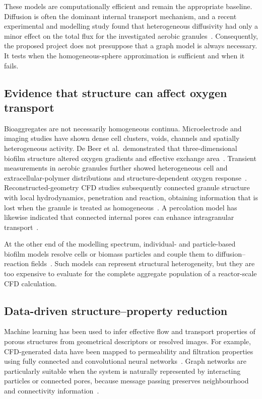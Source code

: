 \documentclass[11pt,a4paper]{article}
\begin{document}
These models are computationally efficient and remain the appropriate
baseline. Diffusion is often the dominant internal transport mechanism, and a
recent experimental and modelling study found that heterogeneous diffusivity
had only a minor effect on the total flux for the investigated aerobic
granules~\cite{VandenBerg2020}. Consequently, the proposed project does not
presuppose that a graph model is always necessary. It tests when the
homogeneous-sphere approximation is sufficient and when it fails.

\subsection{Evidence that structure can affect oxygen transport}

Bioaggregates are not necessarily homogeneous continua. Microelectrode and
imaging studies have shown dense cell clusters, voids, channels and spatially
heterogeneous activity. De Beer et al.\ demonstrated that three-dimensional
biofilm structure altered oxygen gradients and effective exchange
area~\cite{DeBeer1994}. Transient measurements in aerobic granules further
showed heterogeneous cell and extracellular-polymer distributions and
structure-dependent oxygen response~\cite{Chiu2007}. Reconstructed-geometry
CFD studies subsequently connected granule structure with local
hydrodynamics, penetration and reaction, obtaining information that is lost
when the granule is treated as homogeneous~\cite{Liu2010}. A percolation model
has likewise indicated that connected internal pores can enhance intragranular
transport~\cite{Liu2011Percolation}.

At the other end of the modelling spectrum, individual- and particle-based
biofilm models resolve cells or biomass particles and couple them to
diffusion--reaction fields~\cite{Kreft2001,Picioreanu2004}. Such models can
represent structural heterogeneity, but they are too expensive to evaluate for
the complete aggregate population of a reactor-scale CFD calculation.

\subsection{Data-driven structure--property reduction}

Machine learning has been used to infer effective flow and transport
properties of porous structures from geometrical descriptors or resolved
images. For example, CFD-generated data have been mapped to permeability and
filtration properties using fully connected and convolutional neural
networks~\cite{Marcato2022}. Graph networks are particularly suitable when the
system is naturally represented by interacting particles or connected pores,
because message passing preserves neighbourhood and connectivity
information~\cite{SanchezGonzalez2020}.
\end{document}
